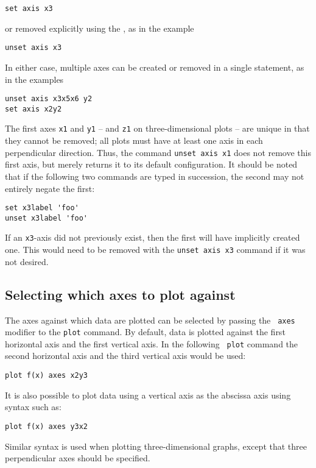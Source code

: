 \begin{verbatim}
set axis x3
\end{verbatim}

\noindent or removed explicitly using the , as in the
example

\begin{verbatim}
unset axis x3
\end{verbatim}

\noindent In either case, multiple axes can be created or removed in a single
statement, as in the examples

\begin{verbatim}
unset axis x3x5x6 y2
set axis x2y2
\end{verbatim}

\noindent The first axes {\tt x1} and {\tt y1} -- and {\tt z1} on
three-dimensional plots -- are unique in that they cannot be removed; all plots
must have at least one axis in each perpendicular direction.  Thus, the command
{\tt unset axis x1} does not remove this first axis, but merely returns it to
its default configuration.  It should be noted that if the following two
commands are typed in succession, the second may not entirely negate the first:

\begin{verbatim}
set x3label 'foo'
unset x3label 'foo'
\end{verbatim}

\noindent If an {\tt x3}-axis did not previously exist, then the first will
have implicitly created one. This would need to be removed with the {\tt unset
axis x3} command if it was not desired.

\subsection{Selecting which axes to plot against}

The axes against which data are plotted can be selected by passing the {\tt
axes} modifier to the {\tt plot} command. By default, data is plotted against
the first horizontal axis and the first vertical axis. In the following {\tt
plot} command the second horizontal axis and the third vertical axis would be
used:
\begin{verbatim}
plot f(x) axes x2y3
\end{verbatim}
It is also possible to plot data using a vertical axis as the abscissa axis
using syntax such as:
\begin{verbatim}
plot f(x) axes y3x2
\end{verbatim}
Similar syntax is used when plotting three-dimensional graphs, except that
three perpendicular axes should be specified.

